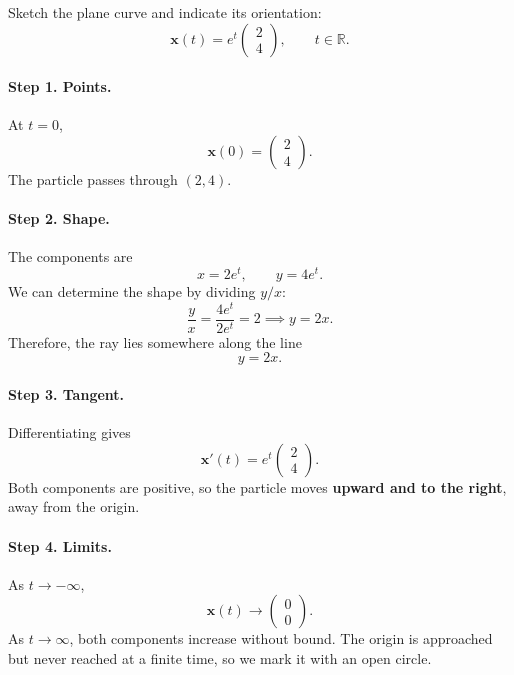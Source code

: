 \documentclass[11pt,letterpaper]{article}
\begin{document}
\begin{example}[4]{
Sketch the plane curve and indicate its orientation:
\[
\mathbf{x}(t)=e^t
\begin{pmatrix}2\\4\end{pmatrix},
\qquad t\in\mathbb R.
\]
}

\paragraph{Step 1. Points.}
At $t=0$,
\[
\mathbf{x}(0)=
\begin{pmatrix}2\\4\end{pmatrix}.
\]
The particle passes through $(2,4)$.

\paragraph{Step 2. Shape.}
The components are
\[
x=2e^t,\qquad y=4e^t.
\]
We can determine the shape by dividing $y/x$:
$$
\frac{y}{x}=\frac{4e^t}{2e^t}=2\implies y=2x.
$$
Therefore, the ray lies somewhere along the line
\[
\boxed{y=2x.}
\]

\paragraph{Step 3. Tangent.}
Differentiating gives
\[
\mathbf{x}'(t)=e^t
\begin{pmatrix}2\\4\end{pmatrix}.
\]
Both components are positive, so the particle moves
\textbf{upward and to the right}, away from the origin.

\paragraph{Step 4. Limits.}
As $t\to-\infty$,
\[
\mathbf{x}(t)\to
\begin{pmatrix}0\\0\end{pmatrix}.
\]
As $t\to\infty$, both components increase without bound.
The origin is approached but never reached at a
finite time, so we mark it with an open circle.

\begin{center}
\end{center}
\end{example}
\end{document}
